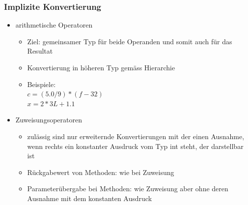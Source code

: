 \documentclass[a4paper,10pt]{article}
\begin{document}
\subsubsection{Implizite Konvertierung}
\begin{itemize}
	\item arithmetische Operatoren
		\begin{itemize}
			\item Ziel: gemeinsamer Typ f\"ur beide Operanden und somit auch f\"ur das Resultat
			\item Konvertierung in h\"oheren Typ gem\"ass Hierarchie
			\item Beispiele: \\ $c = (5.0/9)*(f - 32)$ \\ $x = 2*3L + 1.1$
		\end{itemize}
	\item Zuweisungsoperatoren
		\begin{itemize}
			\item zul\"assig sind nur erweiternde Konvertierungen mit der einen Ausnahme, wenn rechts ein konstanter Ausdruck vom Typ int steht, der darstellbar ist
			\item R\"uckgabewert von Methoden: wie bei Zuweisung
			\item Parameter\"ubergabe bei Methoden: wie Zuweisung aber ohne deren Ausnahme mit dem konstanten Ausdruck
		\end{itemize}
\end{itemize}
\end{document}
